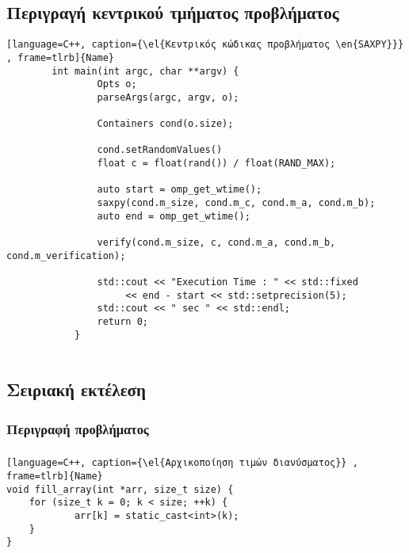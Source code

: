 \subsection{Περιγραγή κεντρικού τμήματος προβλήματος }
\begin{spacing}{1.0}
\begin{lstlisting}[language=C++, caption={\el{Κεντρικός κώδικας προβλήματος \en{SAXPY}}} , frame=tlrb]{Name}
        int main(int argc, char **argv) {
                Opts o;
                parseArgs(argc, argv, o);
         
                Containers cond(o.size);
         
                cond.setRandomValues()
                float c = float(rand()) / float(RAND_MAX);
         
                auto start = omp_get_wtime();
                saxpy(cond.m_size, cond.m_c, cond.m_a, cond.m_b);
                auto end = omp_get_wtime();
         
                verify(cond.m_size, c, cond.m_a, cond.m_b, cond.m_verification);
         
                std::cout << "Execution Time : " << std::fixed
                     << end - start << std::setprecision(5);
                std::cout << " sec " << std::endl;
                return 0;
            }
          
\end{lstlisting}
\end{spacing}

\subsection{Σειριακή εκτέλεση}
\subparagraph{}


\subsubsection{Περιγραφή προβλήματος}
\subparagraph{}



\begin{lstlisting}[language=C++, caption={\el{Αρχικοποίηση τιμών διανύσματος}} , frame=tlrb]{Name}
void fill_array(int *arr, size_t size) {
    for (size_t k = 0; k < size; ++k) {
            arr[k] = static_cast<int>(k);
    }
}
\end{lstlisting}

\clearpage
